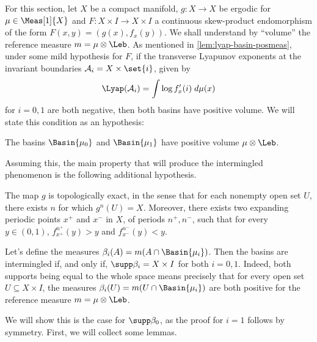 \documentclass[../main]{subfiles}
\begin{document}
For this section, let \(X\) be a compact manifold, \(g \colon X \to X\) be ergodic for \(\mu \in \Meas[1]{X}\) and \(F \colon X \times I \to X \times I\) a continuous skew-product endomorphism of the form \(F(x,y) = (g(x), f_x(y))\). We shall understand by  ``volume'' the reference measure \(m = \mu \otimes \Leb\). As mentioned in \cref{lem:lyap-basin-posmeas}, under some mild hypothesis for \(F\), if the transverse Lyapunov exponents at the invariant boundaries \(\mathcal{A}_i = X \times \set{i}\), given by
\begin{equation*}
  \Lyap(\mathcal{A}_i) = \int \log f_{x}'(i) \;d \mu(x)
\end{equation*}
for \(i = 0,1\) are both negative, then both basins have positive volume. We will state this condition as an hypothesis:

\begin{hypothesis}\label{hip:basins-support-nonempty}
  The basins \(\Basin{\mu_{0}}\) and \(\Basin{\mu_{1}}\) have positive volume \(\mu \otimes \Leb\).
\end{hypothesis}

Assuming this, the main property that will produce the intermingled phenomenon is the following additional hypothesis.

\begin{hypothesis}\label{hip:elevators}
  The map \(g\) is topologically exact, in the sense that for each nonempty open set \(U\), there exists \(n\) for which \(g^n(U) = X\). Moreover, there exists two expanding periodic points \(x^+\) and \(x^-\) in \(X\), of periods \(n^+, n^-\), such that for every \(y \in (0,1)\), \(f_{x^+}^{n^+}(y) > y\) and \(f_{x^-}^{n^-}(y) < y\).
\end{hypothesis}

Let's define the measures \(\beta_i(A) = m(A \cap \Basin{\mu_i})\). Then the basins are intermingled if, and only if, \(\supp \beta_i = X \times I\) for both \(i = 0,1\). Indeed, both supports being equal to the whole space means precisely that for every open set \(U \subseteq X \times I\), the measures \(\beta_i(U) = m(U \cap \Basin{\mu_i})\) are both positive for the reference measure \(m = \mu \otimes \Leb\).

We will show this is the case for \(\supp \beta_0\), as the proof for \(i = 1\) follows by symmetry. First, we will collect some lemmas.
\end{document}
